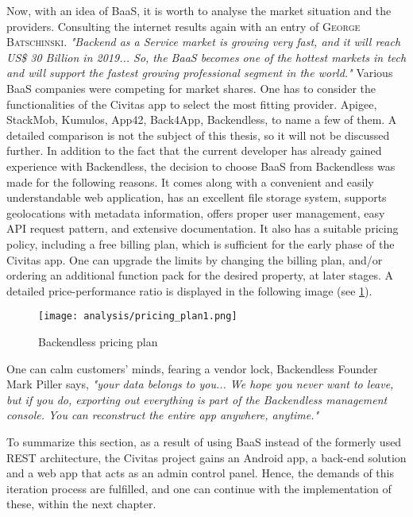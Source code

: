Now, with an idea of BaaS, it is worth to analyse the market situation and the providers. Consulting the internet results again with an entry of \textsc{George Batschinski}.\textit{ "Backend as a Service market is growing very fast, and it will reach US\$ 30 Billion in 2019... So, the BaaS becomes one of the hottest markets in tech and will support the fastest growing professional segment in the world."} \cite{baasProCon}
Various BaaS companies were competing for market shares. One has to consider the functionalities of the Civitas app to select the most fitting provider. Apigee, StackMob, Kumulos, App42, Back4App, Backendless, to name a few of them. A detailed comparison is not the subject of this thesis, so it will not be discussed further.
In addition to the fact that the current developer has already gained experience with Backendless, the decision to choose BaaS from Backendless was made for the following reasons. It comes along with a convenient and easily understandable web application, has an excellent file storage system, supports geolocations with metadata information, offers proper user management, easy API request pattern, and extensive documentation. It also has a suitable pricing policy, including a free billing plan, which is sufficient for the early phase of the Civitas app. One can upgrade the limits by changing the billing plan, and/or ordering an additional function pack for the desired property, at later stages. A detailed price-performance ratio is displayed in the following image (see \ref{fig:pricing_plan}). 

\begin{figure}[H]
	\centering \texttt{[image: analysis/pricing\_plan1.png]}
	\caption{Backendless pricing plan}
	\label{fig:pricing_plan}
\end{figure}

One can calm customers' minds, fearing a vendor lock, Backendless Founder Mark Piller says, \textit{"your data belongs to you... We hope you never want to leave, but if you do, exporting out everything is part of the Backendless management console. You can reconstruct the entire app anywhere, anytime."} \cite{badassBackendless}

To summarize this section, as a result of using BaaS instead of the formerly used REST architecture, the Civitas project gains an Android app, a back-end solution and a web app that acts as an admin control panel. Hence, the demands of this iteration process are fulfilled, and one can continue with the implementation of these, within the next chapter.








